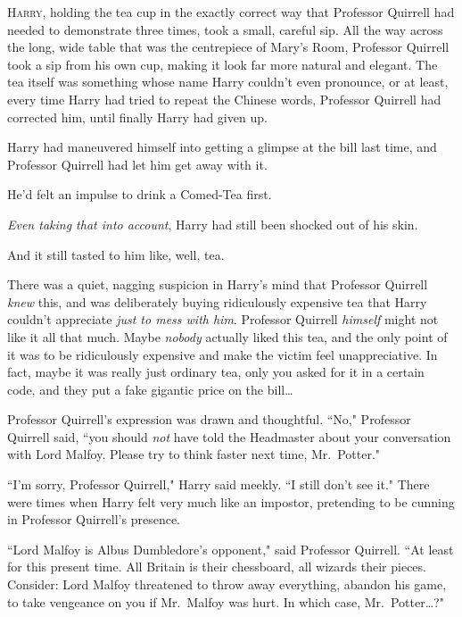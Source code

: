 
\lettrine{H}{arry}, holding the tea cup in the exactly correct way that Professor Quirrell had needed to demonstrate three times, took a small, careful sip. All the way across the long, wide table that was the centrepiece of Mary's Room, Professor Quirrell took a sip from his own cup, making it look far more natural and elegant. The tea itself was something whose name Harry couldn't even pronounce, or at least, every time Harry had tried to repeat the Chinese words, Professor Quirrell had corrected him, until finally Harry had given up.

Harry had maneuvered himself into getting a glimpse at the bill last time, and Professor Quirrell had let him get away with it.

He'd felt an impulse to drink a Comed-Tea first.

\emph{Even taking that into account}, Harry had still been shocked out of his skin.

And it still tasted to him like, well, tea.

There was a quiet, nagging suspicion in Harry's mind that Professor Quirrell \emph{knew} this, and was deliberately buying ridiculously expensive tea that Harry couldn't appreciate \emph{just to mess with him}. Professor Quirrell \emph{himself} might not like it all that much. Maybe \emph{nobody} actually liked this tea, and the only point of it was to be ridiculously expensive and make the victim feel unappreciative. In fact, maybe it was really just ordinary tea, only you asked for it in a certain code, and they put a fake gigantic price on the bill{\ldots}

Professor Quirrell's expression was drawn and thoughtful. ``No," Professor Quirrell said, ``you should \emph{not} have told the Headmaster about your conversation with Lord Malfoy. Please try to think faster next time, Mr.~Potter."

``I'm sorry, Professor Quirrell," Harry said meekly. ``I still don't see it." There were times when Harry felt very much like an impostor, pretending to be cunning in Professor Quirrell's presence.

``Lord Malfoy is Albus Dumbledore's opponent," said Professor Quirrell. ``At least for this present time. All Britain is their chessboard, all wizards their pieces. Consider: Lord Malfoy threatened to throw away everything, abandon his game, to take vengeance on you if Mr.~Malfoy was hurt. In which case, Mr.~Potter{\ldots}?"

